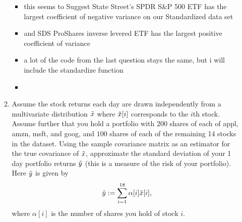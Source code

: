 \documentclass[12pt,twoside]{article}
\begin{document}
\begin{enumerate}
\begin{enumerate}
\begin{itemize}
\begin{center}
\begin{tabular}{c|c|c|c|c|c}
        \end{tabular}
        \end{center}
        \item this seems to Suggest State Street's SPDR S&P 500 ETF has the largest coefficient of negative variance on our Standardized data set 
        \item and SDS ProShares inverse levered ETF has the largest positive coefficient of variance
    \item a lot of the code from the last question stays the same, but i will include the standardize function 
    \item \inputminted[firstline=178, lastline=182, breaklines=True]{python}{hw8.py}
    \end{itemize}
  \item Assume the stock returns each day are drawn independently from a
    multivariate distribution $\tilde{  x }$ where
    $\tilde{  x }[i]$ corresponds to the $i$th stock.  Assume further that
    you hold a portfolio with $200$ shares of each of appl, amzn, msft, and
    goog, and $100$ shares of each of the remaining 14 stocks in the
    dataset.  Using the sample covariance matrix as an estimator for
    the true covariance of $\tilde{  x }$, approximate the standard deviation of
    your 1 day portfolio returns $\tilde{  y }$ (this is a measure of the risk of your
    portfolio).  Here $\tilde{  y }$ is given by
    $$\tilde{  y } := \sum_{i=1}^{18} \alpha[i] \tilde{  x }[i],$$
    where $\alpha[i]$ is the number of shares you hold of stock $i$.
    

\end{enumerate}
\end{enumerate}
\end{document}
